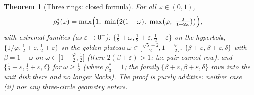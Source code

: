 \documentclass[11pt]{article}
\newtheorem{theorem}{Theorem}
\theoremstyle{definition}
\begin{document}
\begin{theorem}[Three rings: closed formula]\label{thm:Ctrio}
For all $\omega\in(0,1)$,
\[
\rho^*_3(\omega)=\max\Bigl(1,\ \min\bigl(2(1-\omega),\
\max\bigl(\varphi,\ \tfrac{2}{1+2\omega}\bigr)\bigr)\Bigr),
\]
with extremal families (as $\varepsilon\to0^+$):
$\{\tfrac12+\omega,\tfrac12+\varepsilon,\tfrac12+\varepsilon\}$ on the
hyperbola, $\{1/\varphi,\tfrac12+\varepsilon,\tfrac12+\varepsilon\}$ on the
golden plateau
$\omega\in\bigl[\tfrac{\sqrt5-2}{2},1-\tfrac{\varphi}{2}\bigr]$,
$\{\beta+\varepsilon,\beta+\varepsilon,\delta\}$ with $\beta=1-\omega$
on $\omega\in\bigl[1-\tfrac{\varphi}{2},\tfrac12\bigr]$ (there
$2(\beta+\varepsilon)>1$: the pair cannot row), and
$\{\tfrac12+\varepsilon,\tfrac12+\varepsilon,\delta\}$ for
$\omega\ge\tfrac12$ (where $\rho^*_3=1$; the family
$\{\beta+\varepsilon,\beta+\varepsilon,\delta\}$ rows into the unit
disk there and no longer blocks). The proof is
purely additive: neither case (ii) nor any three-circle geometry enters.
\end{theorem}
\end{document}
